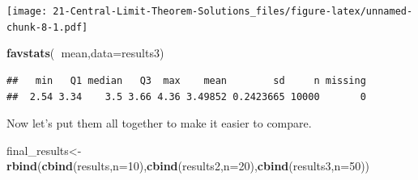 \documentclass[
]{book}
\newenvironment{Shaded}{\begin{snugshade}}{\end{snugshade}}
\newcommand{\DataTypeTok}[1]{\textcolor[rgb]{0.13,0.29,0.53}{#1}}
\newcommand{\DecValTok}[1]{\textcolor[rgb]{0.00,0.00,0.81}{#1}}
\newcommand{\KeywordTok}[1]{\textcolor[rgb]{0.13,0.29,0.53}{\textbf{#1}}}
\newcommand{\NormalTok}[1]{#1}
\newcommand{\OperatorTok}[1]{\textcolor[rgb]{0.81,0.36,0.00}{\textbf{#1}}}
\newcommand{\StringTok}[1]{\textcolor[rgb]{0.31,0.60,0.02}{#1}}
\begin{document}
\begin{Shaded}
\end{Shaded}

\texttt{[image: 21-Central-Limit-Theorem-Solutions\_files/figure-latex/unnamed-chunk-8-1.pdf]}

\begin{Shaded}
\begin{Highlighting}[]
\KeywordTok{favstats}\NormalTok{(}\OperatorTok{~}\NormalTok{mean,}\DataTypeTok{data=}\NormalTok{results3)}
\end{Highlighting}
\end{Shaded}

\begin{verbatim}
##   min   Q1 median   Q3  max    mean        sd     n missing
##  2.54 3.34    3.5 3.66 4.36 3.49852 0.2423665 10000       0
\end{verbatim}

Now let's put them all together to make it easier to compare.

\begin{Shaded}
\begin{Highlighting}[]
\NormalTok{final_results<-}\KeywordTok{rbind}\NormalTok{(}\KeywordTok{cbind}\NormalTok{(results,}\DataTypeTok{n=}\DecValTok{10}\NormalTok{),}\KeywordTok{cbind}\NormalTok{(results2,}\DataTypeTok{n=}\DecValTok{20}\NormalTok{),}\KeywordTok{cbind}\NormalTok{(results3,}\DataTypeTok{n=}\DecValTok{50}\NormalTok{))}
\end{Highlighting}
\end{Shaded}

\begin{Shaded}
\end{Shaded}
\end{document}
